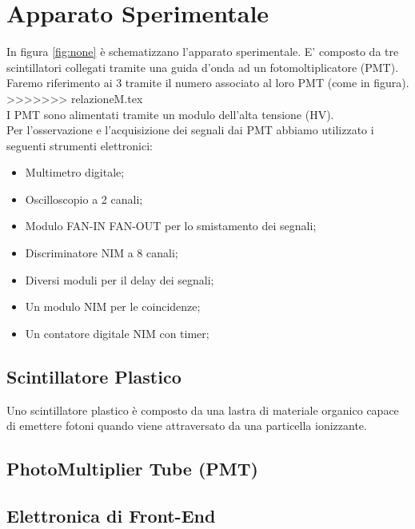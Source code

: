 \documentclass[a4paper,10pt]{article}
\begin{document}
\section{Apparato Sperimentale}
In figura \ref{fig:none} è schematizzano l'apparato sperimentale. E' composto da tre scintillatori collegati tramite una guida d'onda ad un fotomoltiplicatore (PMT). Faremo riferimento ai 3 tramite il numero associato al loro PMT (come in figura).
>>>>>>> relazioneM.tex
\\I PMT sono alimentati tramite un modulo dell'alta tensione (HV). 
\\Per l'osservazione e l'acquisizione dei segnali dai PMT abbiamo utilizzato i seguenti strumenti elettronici:
\begin{itemize}
\item Multimetro digitale;
\item Oscilloscopio a 2 canali;
\item Modulo FAN-IN FAN-OUT per lo smistamento dei segnali;
\item Discriminatore NIM a 8 canali;
\item Diversi moduli per il delay dei segnali;
\item Un modulo NIM per le coincidenze;
\item Un contatore digitale NIM con timer;
\end{itemize}


\label{sec:apparato} 
\subsection{Scintillatore Plastico}
Uno scintillatore plastico è composto da una lastra di materiale organico capace di emettere fotoni quando viene attraversato da una particella ionizzante. 

\subsection{PhotoMultiplier Tube (PMT)}

\subsection{Elettronica di Front-End}


\end{document}

